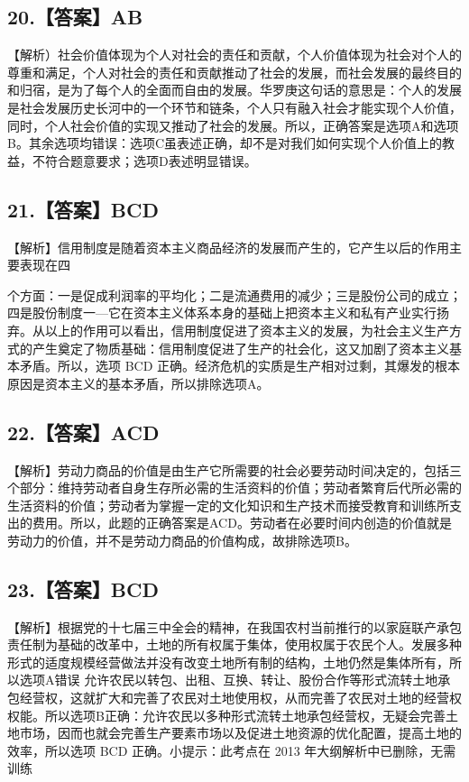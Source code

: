 \documentclass[UTF8,11pt]{ctexart}
\begin{document}
\subsection*{20.【答案】AB}

【解析）社会价值体现为个人对社会的责任和贡献，个人价值体现为社会对个人的尊重和满足，个人对社会的责任和贡献推动了社会的发展，而社会发展的最终目的和归宿，是为了每个人的全面而自由的发展。华罗庚这句话的意思是：个人的发展是社会发展历史长河中的一个环节和链条，个人只有融入社会才能实现个人价值，同时，个人社会价值的实现又推动了社会的发展。所以，正确答案是选项A和选项B。其余选项均错误：选项C虽表述正确，却不是对我们如何实现个人价值上的教益，不符合题意要求；选项D表述明显错误。


\subsection*{21.【答案】BCD}

【解析】信用制度是随着资本主义商品经济的发展而产生的，它产生以后的作用主要表现在四


个方面：一是促成利润率的平均化；二是流通费用的减少；三是股份公司的成立；四是股份制度一—它在资本主义体系本身的基础上把资本主义和私有产业实行扬弃。从以上的作用可以看出，信用制度促进了资本主义的发展，为社会主义生产方式的产生奠定了物质基础：信用制度促进了生产的社会化，这又加剧了资本主义基本矛盾。所以，选项 BCD 正确。经济危机的实质是生产相对过剩，其爆发的根本原因是资本主义的基本矛盾，所以排除选项A。


\subsection*{22.【答案】ACD}

【解析】劳动力商品的价值是由生产它所需要的社会必要劳动时间决定的，包括三个部分：维持劳动者自身生存所必需的生活资料的价值；劳动者繁育后代所必需的生活资料的价值；劳动者为掌握一定的文化知识和生产技术而接受教育和训练所支出的费用。所以，此题的正确答案是ACD。劳动者在必要时间内创造的价值就是劳动力的价值，并不是劳动力商品的价值构成，故排除选项B。


\subsection*{23.【答案】BCD}

【解析】根据党的十七届三中全会的精神，在我国农村当前推行的以家庭联产承包责任制为基础的改革中，土地的所有权属于集体，使用权属于农民个人。发展多种形式的适度规模经营做法并没有改变土地所有制的结构，土地仍然是集体所有，所以选项A错误 允许农民以转包、出租、互换、转让、股份合作等形式流转土地承包经营权，这就扩大和完善了农民对土地使用权，从而完善了农民对土地的经营权权能。所以选项B正确：允许农民以多种形式流转土地承包经营权，无疑会完善土地市场，因而也就会完善生产要素市场以及促进土地资源的优化配置，提高土地的效率，所以选项 BCD 正确。小提示：此考点在 2013 年大纲解析中已删除，无需训练
\end{document}
